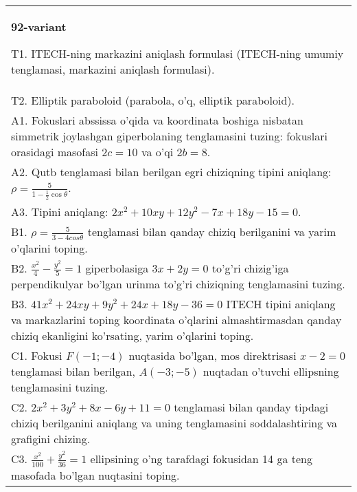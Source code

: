 \documentclass{article}
\begin{document}
\begin{tabular}{m{17cm}}
\textbf{92-variant}
\newline

T1. ITECH-ning markazini aniqlash formulasi (ITECH-ning umumiy tenglamasi, markazini aniqlash formulasi).\\

T2. Elliptik paraboloid (parabola, o'q, elliptik paraboloid).\\

A1. Fokuslari abssissa o'qida va koordinata boshiga nisbatan simmetrik joylashgan giperbolaning tenglamasini tuzing: fokuslari orasidagi masofasi $2c=10$ va o'qi $2b=8$.\\

A2. Qutb tenglamasi bilan berilgan egri chiziqning tipini aniqlang: $\rho=\frac{5}{1-\frac{1}{2}\cos\theta}$.\\

A3. Tipini aniqlang: $2x^{2}+10xy+12y^{2}-7x+18y-15=0$.\\

B1. $\rho = \frac{5}{3 - 4cos\theta}$ tenglamasi bilan qanday chiziq berilganini va yarim o'qlarini toping.  \\

B2. $\frac{x^{2}}{4} - \frac{y^{2}}{5} = 1$ giperbolasiga $3x + 2y = 0$ to'g'ri chizig'iga perpendikulyar bo'lgan urinma to'g'ri chiziqning tenglamasini tuzing.\\

B3. $41x^{2} + 24xy + 9y^{2} + 24x + 18y - 36 = 0$ ITECH tipini aniqlang va markazlarini toping koordinata o'qlarini almashtirmasdan qanday chiziq ekanligini ko'rsating, yarim o'qlarini toping.  \\

C1. Fokusi $F( - 1; - 4)$ nuqtasida bo'lgan, mos direktrisasi $x - 2 = 0$ tenglamasi bilan berilgan, $A( - 3; - 5)$ nuqtadan o'tuvchi ellipsning tenglamasini tuzing.  \\

C2. $2x^{2} + 3y^{2} + 8x - 6y + 11 = 0$ tenglamasi bilan qanday tipdagi chiziq berilganini aniqlang va uning tenglamasini soddalashtiring va grafigini chizing.  \\

C3. $\frac{x^{2}}{100} + \frac{y^{2}}{36} = 1$ ellipsining o'ng tarafdagi fokusidan 14 ga teng masofada bo'lgan nuqtasini toping.  \\

\end{tabular}
\vspace{1cm}
\end{document}
